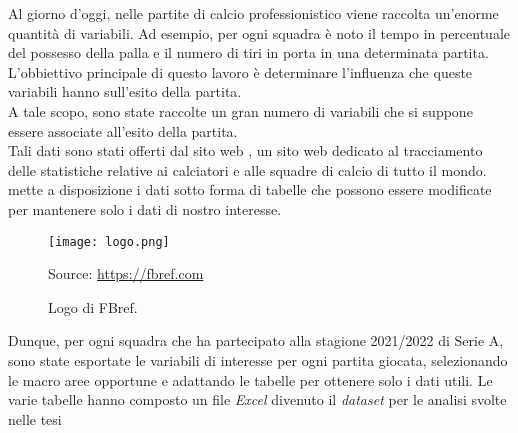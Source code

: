 Al giorno d'oggi, nelle partite di calcio professionistico viene raccolta un'enorme quantità di variabili. Ad esempio, per ogni squadra è noto il tempo in percentuale del possesso della palla e il numero di tiri in porta in una determinata partita. L'obbiettivo principale di questo lavoro è determinare l'influenza che queste variabili hanno sull'esito della partita. \\
A tale scopo, sono state raccolte un gran numero di variabili che si suppone essere associate all'esito della partita.\\
Tali dati sono stati offerti dal sito web \textit{\cite{fbref}}, un sito web dedicato al tracciamento delle statistiche relative ai calciatori e alle squadre di calcio di tutto il mondo. \textit{\cite{fbref}} mette a disposizione i dati sotto forma di tabelle che possono essere modificate per mantenere solo i dati di nostro interesse.\\
\begin{figure}[!htb]
	\begin{center}
		\texttt{[image: logo.png]}
		\caption{Logo di FBref.} 
		Source: \url{https://fbref.com}
		\label{fig:logo}
	\end{center}
\end{figure}



Dunque, per ogni squadra che ha partecipato alla stagione 2021/2022 di Serie A, sono state esportate le variabili di interesse per ogni partita giocata, selezionando le macro aree opportune e adattando le tabelle per ottenere solo i dati utili. Le varie tabelle hanno composto un file \emph{Excel} divenuto il \emph{dataset} per le analisi svolte nelle tesi 

